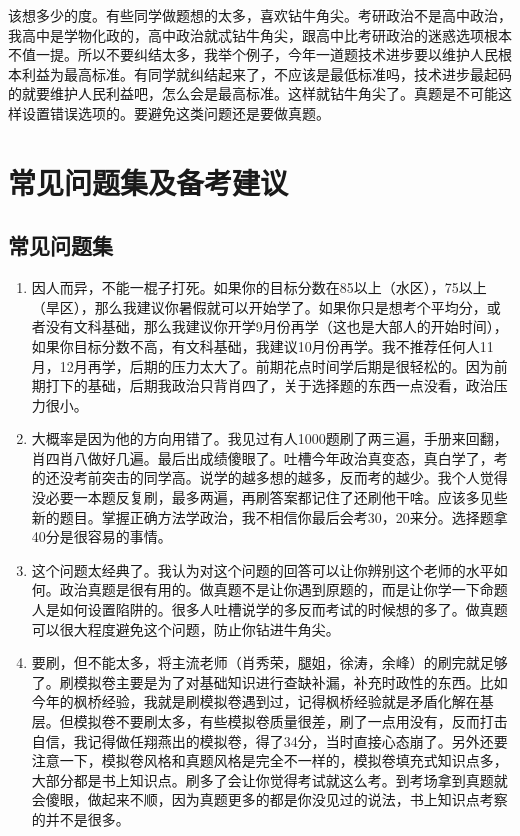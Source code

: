 \documentclass[lang=cn,blue,10pt,scheme=chinese,twocol]{zznote}
\begin{document}
\begin{definition}[该想多少的度]
	该想多少的度。有些同学做题想的太多，喜欢钻牛角尖。考研政治不是高中政治，我高中是学物化政的，高中政治就忒钻牛角尖，跟高中比考研政治的迷惑选项根本不值一提。所以不要纠结太多，我举个例子，今年一道题技术进步要以维护人民根本利益为最高标准。有同学就纠结起来了，不应该是最低标准吗，技术进步最起码的就要维护人民利益吧，怎么会是最高标准。这样就钻牛角尖了。真题是不可能这样设置错误选项的。要避免这类问题还是要做真题。
\end{definition}

\chapter{常见问题集及备考建议}
\section{常见问题集}
\begin{enumerate}[itemsep=1.3ex]
	\item {}
	      因人而异，不能一棍子打死。如果你的目标分数在85以上（水区），75以上（旱区），那么我建议你暑假就可以开始学了。如果你只是想考个平均分，或者没有文科基础，那么我建议你开学9月份再学（这也是大部人的开始时间），如果你目标分数不高，有文科基础，我建议10月份再学。我不推荐任何人11月，12月再学，后期的压力太大了。前期花点时间学后期是很轻松的。因为前期打下的基础，后期我政治只背肖四了，关于选择题的东西一点没看，政治压力很小。
	\item {}
	      大概率是因为他的方向用错了。我见过有人1000题刷了两三遍，手册来回翻，肖四肖八做好几遍。最后出成绩傻眼了。吐槽今年政治真变态，真白学了，考的还没考前突击的同学高。说学的越多想的越多，反而考的越少。我个人觉得没必要一本题反复刷，最多两遍，再刷答案都记住了还刷他干啥。应该多见些新的题目。掌握正确方法学政治，我不相信你最后会考30，20来分。选择题拿40分是很容易的事情。
	\item {}
	      这个问题太经典了。我认为对这个问题的回答可以让你辨别这个老师的水平如何。政治真题是很有用的。做真题不是让你遇到原题的，而是让你学一下命题人是如何设置陷阱的。很多人吐槽说学的多反而考试的时候想的多了。做真题可以很大程度避免这个问题，防止你钻进牛角尖。
	\item {}
	      要刷，但不能太多，将主流老师（肖秀荣，腿姐，徐涛，余峰）的刷完就足够了。刷模拟卷主要是为了对基础知识进行查缺补漏，补充时政性的东西。比如今年的枫桥经验，我就是刷模拟卷遇到过，记得枫桥经验就是矛盾化解在基层。但模拟卷不要刷太多，有些模拟卷质量很差，刷了一点用没有，反而打击自信，我记得做任翔燕出的模拟卷，得了34分，当时直接心态崩了。另外还要注意一下，模拟卷风格和真题风格是完全不一样的，模拟卷填充式知识点多，大部分都是书上知识点。刷多了会让你觉得考试就这么考。到考场拿到真题就会傻眼，做起来不顺，因为真题更多的都是你没见过的说法，书上知识点考察的并不是很多。{\par}
\end{enumerate}
\vspace{1em}
\end{document}
